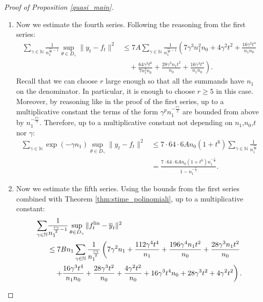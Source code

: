 \documentclass{article}
\theoremstyle{definition}
\theoremstyle{remark}
\numberwithin{equation}{section}
\newcommand{\N}{\mathbb{N}}
\newcommand{\lin}{{\textup{lin}}}
\newcommand{\norm}[2]{
    \|#1\|_{#2}
}
\begin{document}
\begin{proof}[Proof of Proposition \ref{quasi_main}]
\begin{enumerate}
        \item Now we estimate the fourth series. 
        Following the reasoning from the first series:
        \begin{align}
            \sum_{\gamma \in \N}\frac{1}{n_1^{\frac{r\gamma}{2}-1}} \sup_{\theta \in D_\gamma}\norm{y_t-f_t}{}^2 &\le 7A\sum_{\gamma \in \N}\frac{1}{n_1^{\frac{r\gamma}{2}-1}}\left(7\gamma^3 n_1^2n_0 +4\gamma^2 t^2 + \frac{16\gamma^3t^4}{n_1n_0} \right.\\
            &\left.\quad + \frac{64\gamma^3t^6}{7n_1^2n_0} + \frac{28\gamma^3n_1t^2}{n_0} + \frac{16\gamma^3t^4}{n_1n_0}\right).
        \end{align}
        Recall that we can choose $r$ large enough so that all the summands have $n_1$ on the denominator.
        In particular, it is enough to choose $r\ge 5$ in this case.
        Moreover, by reasoning like in the proof of the first series,
        up to a multiplicative constant the terms of the form $\gamma^pn_1^{-\frac{r\gamma}{2}}$ are bounded from above by $n_1^{-\frac{r\gamma}{4}}$.
        Therefore, up to a multiplicative constant not depending on $n_1$,$n_0$,$t$ nor $\gamma$:
        \begin{align}
            \sum_{\gamma \in \N}\exp(-\gamma n_1) \sup_{\theta \in D_\gamma}\norm{y_t-f_t}{}^2 &\le 7\cdot 64 \cdot 6An_0(1+t^6)\sum_{\gamma \in \N}\frac{1}{n_1^\frac{r\gamma}{4}}\\
            &=\frac{7\cdot 64 \cdot 6An_0(1+t^6)n_1^{-\frac{r}{4}}}{1-n_1^{-\frac{r}{4}}}.
        \end{align}

        \item Now we estimate the fifth series.
        Using the bounds from the first series combined with Theorem \ref{thm:stime_polinomiali}, up to a multiplicative constant:
        \begin{align}
            \sum_{\gamma \in \N}&\frac{1}{n_1^{\frac{r\gamma}{2}-1}} \sup_{\theta \in D_\gamma}\norm{f_t^\lin - \overline y_t}{}^2 \\
            &\le 7Bn_1\sum_{\gamma \in \N}\frac{1}{n_1^\frac{r\gamma}{2}} \left(7\gamma^2 n_1+ \frac{112\gamma^4t^4}{n_1}+\frac{196\gamma^4n_1t^2}{n_0}+\frac{28\gamma^3n_1t^2}{n_0}\right.\\
            &\left.\quad +\frac{16\gamma^3t^4}{n_1n_0}+\frac{28\gamma^3 t^2}{n_0} +\frac{4\gamma^2 t^2}{n_0}+16\gamma^3t^4n_0 +28\gamma^3t^2+4\gamma^2t^2\right).
        \end{align}
    

\end{enumerate}
\end{proof}
\end{document}
